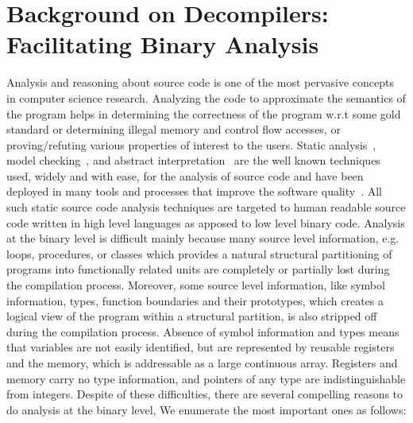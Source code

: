\chapter{Background on Decompilers: Facilitating Binary
  Analysis}\label{sec:decompilers} Analysis and reasoning about source code is
  one of the most pervasive concepts in computer science research. Analyzing
  the code to approximate  the semantics of the program helps in determining
  the correctness of the program w.r.t some gold standard or determining
  illegal memory and control flow accesses, or proving/refuting various
  properties of interest to the users. Static analysis~\cite{Nielson2010},
  model checking~\cite{Clarke1981,Queille1982}, and abstract
  interpretation~\cite{Cousot1977} are the well known techniques used, widely
  and with ease, for the  analysis of source code and have been deployed in
  many tools and processes that improve the software
  quality~\cite{Xie:2003,Musuvathi:2008,Ivancic:2005,Dwyer:2007,Binkley:2007,Bessey2010,Ball2006}.
    All such
      static source code analysis techniques are targeted to human readable
      source code written in high level languages as apposed to low level
      binary code. Analysis at the binary level is difficult mainly because
      many source level information, e.g. loops, procedures, or classes which
      provides a natural structural partitioning of programs into functionally
      related units  are completely or
      partially lost during the compilation process. Moreover, some source
      level information, like symbol information, types, function boundaries
      and their prototypes, which creates a logical view of the program  within
      a structural partition, is also stripped off during the compilation
      process. Absence of symbol information and types means that variables are
      not easily identified, but are represented by reusable registers and the
      memory, which is addressable as a large continuous array.  Registers and
      memory carry no type information, and pointers of any type are
      indistinguishable from integers.  Despite of these difficulties, there
      are several compelling reasons to do analysis at the binary level, We
      enumerate the most important ones as follows:

